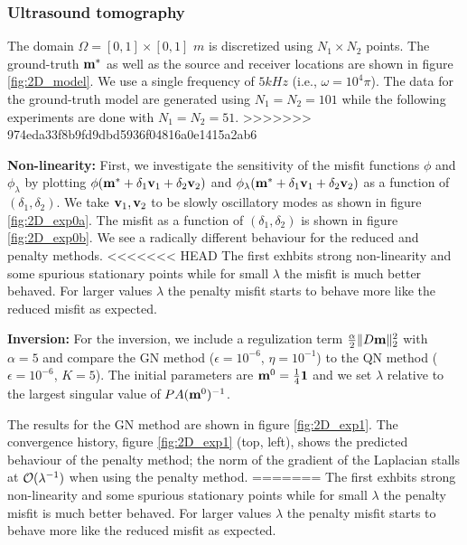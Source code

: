 \documentclass{iopart}
\begin{document}
{\subsubsection{Ultrasound tomography}

The domain $\Omega = [0,1]\times [0,1]$ $m$  is discretized using $N_1\times N_2$ points. 
The ground-truth $\mathbf{m}^*$ as well as the source and receiver locations are shown in figure  \ref{fig:2D_model}. We use a single frequency of $5 kHz$ (i.e., $\omega = 10^4\pi$). The data for the ground-truth model are generated using $N_1=N_2=101$ while the following experiments are done with $N_1=N_2=51$.
>>>>>>> 974eda33f8b9fd9dbd5936f04816a0e1415a2ab6

\textbf{Non-linearity:}
First, we investigate the sensitivity of the misfit functions $\phi$ and $\phi_{\lambda}$ by plotting $\phi(\mathbf{m}^* + \delta_1 \mathbf{v}_1 + \delta_2\mathbf{v}_2)$ and $\phi_{\lambda}(\mathbf{m}^* + \delta_1 \mathbf{v}_1 + \delta_2\mathbf{v}_2)$ as a function of $(\delta_1,\delta_2)$. 
We take $\mathbf{v}_1, \mathbf{v}_2$ to be slowly oscillatory modes as shown in figure \ref{fig:2D_exp0a}. The misfit as a function of $(\delta_1,\delta_2)$ is shown in figure \ref{fig:2D_exp0b}. We see a radically different behaviour for the reduced and penalty methods.
<<<<<<< HEAD
The first exhbits strong non-linearity and some spurious stationary points while for small $\lambda$ the misfit is much better behaved. For larger values $\lambda$ the penalty misfit starts to behave more like the reduced misfit as expected.

\textbf{Inversion:}
For the inversion, we include a regulization term $\frac{\alpha}{2} \|D\mathbf{m}\|_2^2$ with $\alpha = 5$ and compare  the GN method ($\epsilon=10^{-6}$, $\eta=10^{-1}$) to the QN method ($\epsilon=10^{-6}$, $K=5$). The initial parameters are $\mathbf{m}^0 = \frac{1}{4}\mathbf{1}$ and we set $\lambda$ relative to the largest singular value of $PA(\mathbf{m}^0)^{-1}$.

The results for the GN method are shown in figure \ref{fig:2D_exp1}.
The convergence history, figure \ref{fig:2D_exp1} (top, left), shows the predicted behaviour of the penalty method; the norm of the gradient of the Laplacian stalls at $\mathcal{O}(\lambda^{-1})$ when using the penalty method. 
=======
The first exhbits strong non-linearity and some spurious stationary points while for small $\lambda$ the penalty misfit is much better behaved. For larger values $\lambda$ the penalty misfit starts to behave more like the reduced misfit as expected.

}
\end{document}
